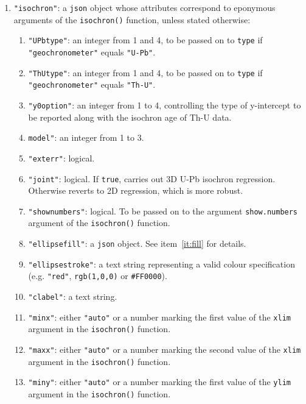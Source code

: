 \begin{refsection}
\begin{enumerate}[leftmargin=\parindent,align=left,
      labelwidth=\parindent,label*=2.\arabic*.]
\begin{enumerate}[leftmargin=\parindent,align=left,
      labelwidth=\parindent,label*=\arabic*.]
  \end{enumerate}
\item{\tt "isochron"}: a \texttt{json} object whose attributes
  correspond to eponymous arguments of the \texttt{isochron()}
  function, unless stated otherwise:
  \begin{enumerate}[leftmargin=\parindent,align=left,
      labelwidth=\parindent,label*=\arabic*.]
      \item{\tt "UPbtype"}: an integer from 1 and 4, to be passed on to
        \texttt{type} if \texttt{"geochronometer"} equals
        \texttt{"U-Pb"}.
      \item{\tt "ThUtype"}: an integer from 1 and 4, to be passed on to
        \texttt{type} if \texttt{"geochronometer"} equals
        \texttt{"Th-U"}.
      \item{\tt "y0option"}: an integer from 1 to 4, controlling the
        type of y-intercept to be reported along with the isochron age
        of Th-U data.
      \item{\tt model"}: an integer from 1 to 3.
      \item{\tt "exterr"}: logical.
      \item{\tt "joint"}: logical. If \texttt{true}, carries out 3D
        U-Pb isochron regression. Otherwise reverts to 2D regression,
        which is more robust.
      \item{\tt "shownumbers"}: logical. To be passed on to the
        argument \texttt{show.numbers} argument of the
        \texttt{isochron()} function.
      \item{\tt "ellipsefill"}: a \texttt{json} object. See
        item~\ref{it:fill} for details.
      \item{\tt "ellipsestroke"}: a text string representing a valid
        colour specification (e.g. \texttt{"red"}, \texttt{rgb(1,0,0)} or
        \texttt{\#FF0000}).
      \item{\tt "clabel"}: a text string.
      \item{\tt "minx"}: either \texttt{"auto"} or a number marking the
        first value of the \texttt{xlim} argument in the
        \texttt{isochron()} function.
      \item{\tt "maxx"}: either \texttt{"auto"} or a number marking the
        second value of the \texttt{xlim} argument in the
        \texttt{isochron()} function.
      \item{\tt "miny"}: either \texttt{"auto"} or a number marking the
        first value of the \texttt{ylim} argument in the
        \texttt{isochron()} function.

\end{enumerate}
\end{enumerate}
\end{refsection}
